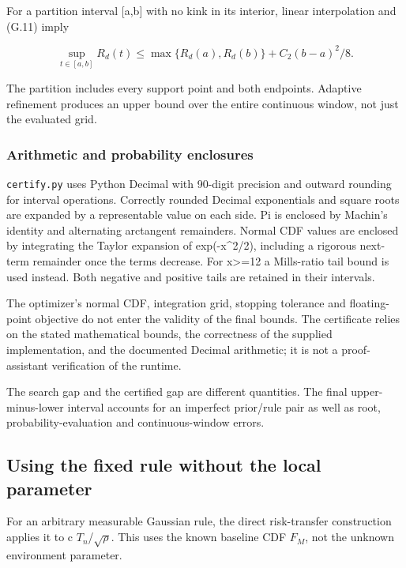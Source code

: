 For a partition interval {[}a,b{]} with no kink in its interior, linear interpolation and (G.11) imply

\[
\sup_{t\in[a,b]}R_d(t)
\le\max\{R_d(a),R_d(b)\}+C_2(b-a)^2/8.
\tag{G.12}
\]

The partition includes every support point and both endpoints. Adaptive refinement produces an upper bound over the entire continuous window, not just the evaluated grid.

\subsubsection{Arithmetic and probability enclosures}\label{arithmetic-and-probability-enclosures}

\texttt{certify.py} uses Python Decimal with 90-digit precision and outward rounding for interval operations. Correctly rounded Decimal exponentials and square roots are expanded by a representable value on each side. Pi is enclosed by Machin's identity and alternating arctangent remainders. Normal CDF values are enclosed by integrating the Taylor expansion of exp(-x\^{}2/2), including a rigorous next-term remainder once the terms decrease. For \textbar x\textbar\textgreater=12 a Mills-ratio tail bound is used instead. Both negative and positive tails are retained in their intervals.

The optimizer's normal CDF, integration grid, stopping tolerance and floating-point objective do not enter the validity of the final bounds. The certificate relies on the stated mathematical bounds, the correctness of the supplied implementation, and the documented Decimal arithmetic; it is not a proof-assistant verification of the runtime.

The search gap and the certified gap are different quantities. The final upper-minus-lower interval accounts for an imperfect prior/rule pair as well as root, probability-evaluation and continuous-window errors.

\subsection{Using the fixed rule without the local parameter}\label{using-the-fixed-rule-without-the-local-parameter}

For an arbitrary measurable Gaussian rule, the direct risk-transfer construction applies it to c \(T_n\)/\(\sqrt\rho\). This uses the known baseline CDF \(F_M\), not the unknown environment parameter.

